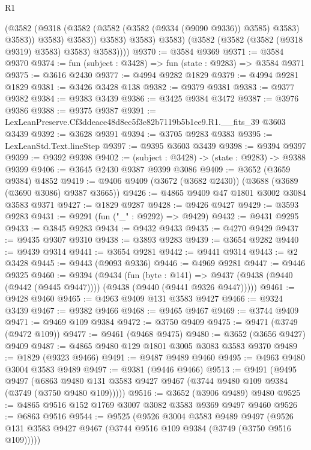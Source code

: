 \begin{lexlean}{R1}
\begin{coremodule}
                    (@3582
                      (@9318 (@3582 (@3582 (@3582 (@9334 (@9090 @9336)) @3585) @3583) @3583))
                      @3583)
                    @3583))
                @3583)
              @3583)
            @3583)
          (@3582 (@3582 (@3582 (@9318 @9319) @3583) @3583) @3583))))
@9370 := @3584 @9369
@9371 := @3584 @9370
@9374 := fun (subject : @3428) => fun (state : @9283) => @3584 @9371
@9375 := @3616 @2430
@9377 := @4994 @9282 @1829
@9379 := @4994 @9281 @1829
@9381 := @3426 @3428 @138
@9382 := @9379 @9381
@9383 := @9377 @9382
@9384 := @9383 @3439
@9386 := @3425 @9384 @3472
@9387 := @3976 @9386
@9388 := @9375 @9387
@9391 := LexLeanPreserve.Cf3ddeace48d8ec5f3e82b7119b5b1ee9.R1.__fits_39 @3603 @3439
@9392 := @3628 @9391
@9394 := @3705 @9283 @9383
@9395 := LexLeanStd.Text.lineStep
@9397 := @9395 @3603 @3439
@9398 := @9394 @9397
@9399 := @9392 @9398
@9402 := (subject : @3428) -> (state : @9283) -> @9388 @9399
@9406 := @3645 @2430 @9387 @9399 @3086
@9409 := @3652 (@3659 @9384) @4852
@9419 := @9406 @9409 (@3672 (@3682 @2430)) (@3688 (@3689 (@3690 @3086) @9387 @3665))
@9426 := @4865 @9409 @47 @1801 @3002 @3084 @3583 @9371
@9427 := @1829 @9287
@9428 := @9426 @9427
@9429 := @3593 @9283
@9431 := @9291 (fun ("_" : @9292) => @9429)
@9432 := @9431 @9295
@9433 := @3845 @9283
@9434 := @9432 @9433
@9435 := @4270 @9429
@9437 := @9435 @9307 @9310
@9438 := @3893 @9283
@9439 := @3654 @9282
@9440 := @9439 @9314
@9441 := @3654 @9281
@9442 := @9441 @9314
@9443 := @2 @3428
@9445 := @9443 (@9093 @9336)
@9446 := @4969 @9281
@9447 := @9446 @9325
@9460 := @9394
    (@9434
      (fun (byte : @141) =>
      @9437 (@9438 (@9440 (@9442 (@9445 @9447)))) (@9438 (@9440 (@9441 @9326 @9447)))))
@9461 := @9428 @9460
@9465 := @4963 @9409 @131 @3583 @9427
@9466 := @9324 @3439
@9467 := @9382 @9466
@9468 := @9465 @9467
@9469 := @3744 @9409
@9471 := @9469 @109 @9384
@9472 := @3750 @9409
@9475 := @9471 (@3749 (@9472 @109))
@9477 := @9461 (@9468 @9475)
@9480 := @3652 (@3656 @9427) @9409
@9487 := @4865 @9480 @129 @1801 @3005 @3083 @3583 @9370
@9489 := @1829 (@9323 @9466)
@9491 := @9487 @9489 @9460
@9495 := @4963 @9480 @3004 @3583 @9489
@9497 := @9381 (@9446 @9466)
@9513 := @9491
    (@9495
      @9497
      (@6863 @9480 @131 @3583 @9427 @9467 (@3744 @9480 @109 @9384 (@3749 (@3750 @9480 @109)))))
@9516 := @3652 (@3906 @9489) @9480
@9525 := @4865 @9516 @152 @1769 @3007 @3082 @3583 @9369 @9497 @9460
@9526 := @6863 @9516
@9544 := @9525
    (@9526
      @3004
      @3583
      @9489
      @9497
      (@9526 @131 @3583 @9427 @9467 (@3744 @9516 @109 @9384 (@3749 (@3750 @9516 @109)))))

\end{coremodule}
\end{lexlean}
